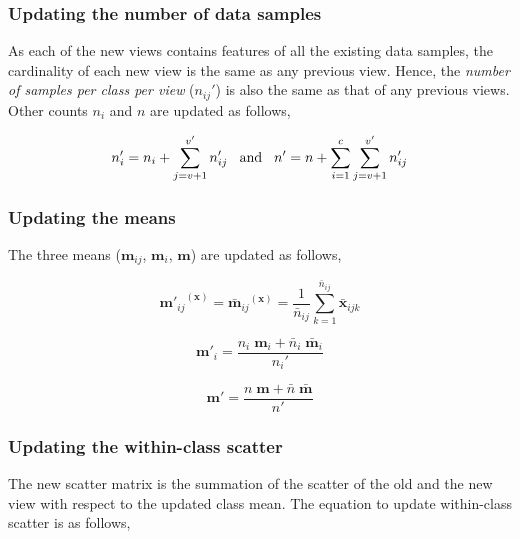 \subsubsection{Updating the number of data samples}
\label{ssubs:VIDMvDA_Inc_n}
As each of the new views contains features of all the existing data samples, the cardinality of each new view is the same as any previous view. Hence, the \textit{number of samples per class per view} ($n_{ij}'$) is also the same as that of any previous views. Other counts $n_i$ and $n$ are updated as follows,

\begin{equation}
\label{eqn:VIDMvDA_Add_n}
n'_i = n_i + \sum\limits_{j=v+1}^{v'} n_{ij}' \hspace{0.3cm} \text{and} \hspace{0.3cm} n' = n + \sum\limits_{i=1}^{c} \sum\limits_{j=v+1}^{v'} n'_{ij}
\end{equation}





\subsubsection{Updating the means}
\label{ssubs:VIDMvDA_Inc_mu}
The three means ($\textbf{m}_{ij}$, $\textbf{m}_{i}$, $\textbf{m}$) are updated as follows,

\begin{equation}
\label{eqn:VIDMvDA_Add_mu_ij}
{\textbf{m}'_{ij}}^{(\textbf{x})} = {\bar{\textbf{m}}_{ij}}^{(\textbf{x})} = \frac{1}{\bar{n}_{ij}} \sum\limits_{k=1}^{\bar{n}_{ij}} \bar{\textbf{x}}_{ijk}
\end{equation}

\begin{equation}
\label{eqn:VIDMvDA_Add_mu_i}
\textbf{m}'_{i} = \frac{n_i \; \textbf{m}_{i} + \bar{n}_i \; \bar{\textbf{m}}_i}{n_i'}
\end{equation}

\begin{equation}
\label{eqn:VIDMvDA_Add_mu}
\textbf{m}' = \frac{n \; \textbf{m} + \bar{n} \; \bar{\textbf{m}}}{n'}
\end{equation}





\subsubsection{Updating the within-class scatter}
\label{ssubs:VIDMvDA_Inc_Sw}
The new scatter matrix is the summation of the scatter of the old and the new view with respect to the updated class mean. The equation to update within-class scatter is as follows,

